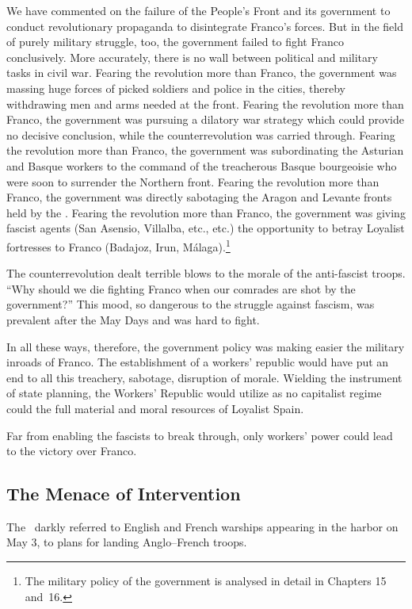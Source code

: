 We have commented on the failure of the People’s Front and its government to conduct revolutionary propaganda to disintegrate Franco’s forces. But in the field of purely military struggle, too, the government failed to fight Franco conclusively. More accurately, there is no wall between political and military tasks in civil war. Fear\-ing the revolution more than Franco, the government was massing huge forces of picked soldiers and police in the cities, thereby withdrawing men and arms needed at the front. Fearing the revolution more than Franco, the government was pursuing a dilatory war strategy which could provide no decisive conclusion, while the counterrevolution was carried through. Fearing the revolution more than Franco, the government was subordinating the Asturian and Basque workers to the command of the treacherous Basque bourgeoisie who were soon to surrender the Northern front. Fearing the revolution more than Franco, the government was directly sabotaging the Aragon and Levante fronts held by the \CNT\kn. Fearing the revolution more than Franco, the government was giving fascist agents (San Asensio, Villalba, etc., etc.) the opportunity to betray Loyalist fortresses to Franco (Badajoz, Irun, M\'alaga).\footnote{The military policy of the government is analysed in detail in Chapters 15 and~16.}

The counterrevolution dealt terrible blows to the morale of the anti-fascist troops. ``Why should we die fighting Franco when our comrades are shot by the government?'' This mood, so dangerous to the struggle against fascism, was prevalent after the May Days and was hard to fight.

In all these ways, therefore, the government policy was making easier the military inroads of Franco. The establishment of a workers’ republic would have put an end to all this treachery, sabotage, disruption of morale. Wielding the instrument of state planning, the Workers’ Republic would utilize as no capitalist regime could the full material and moral resources of Loyalist Spain.

Far from enabling the fascists to break through, only workers’ power could lead to the victory over Franco.

\subsection*{The Menace of Intervention}

The \CNT\ darkly referred to English and French warships appearing in the harbor on May 3, to plans for landing Anglo--French troops. 


